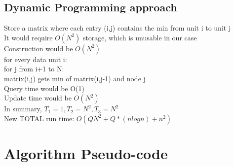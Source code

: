 \documentclass[11pt,psfig]{article}
\begin{document}
\subsection*{Dynamic Programming approach}
		Store a matrix where each entry (i,j) contains the min from unit i to unit j\\
		It would require $O(N^2)$ storage, which is unusable in our case\\
		Construction would be $O(N^2)$\\
			for every data unit i:\\
				for j from i+1 to N:\\
					matrix(i,j) gets min of matrix(i,j-1) and node j\\
		Query time would be O(1)\\
		Update time would be $O(N^2)$\\
		In summary, $T_1=1, T_2=N^2, T_3=N^2$\\
		New TOTAL run time: $O(QN^2 + Q*(n log n) + n^2)$\\

\section*{Algorithm Pseudo-code}
\end{document}
